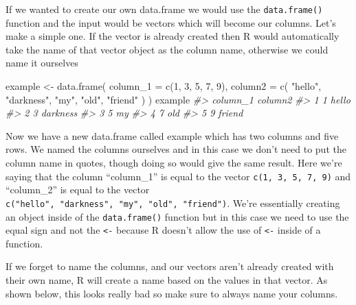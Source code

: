 \documentclass[
]{krantz}
\makeatletter
\newenvironment{Shaded}{\begin{snugshade}}{\end{snugshade}}
\newcommand{\AttributeTok}[1]{\textcolor[rgb]{0.61,0.61,0.61}{#1}}
\newcommand{\CommentTok}[1]{\textcolor[rgb]{0.37,0.37,0.37}{\textit{#1}}}
\newcommand{\DecValTok}[1]{\textcolor[rgb]{0.06,0.06,0.06}{#1}}
\newcommand{\FunctionTok}[1]{\textcolor[rgb]{0,0,0}{#1}}
\newcommand{\NormalTok}[1]{#1}
\newcommand{\OtherTok}[1]{\textcolor[rgb]{0.37,0.37,0.37}{#1}}
\newcommand{\StringTok}[1]{\textcolor[rgb]{0.5,0.5,0.5}{#1}}
\newenvironment{kframe}{%
\medskip{}
\setlength{\fboxsep}{.8em}
 \def\at@end@of@kframe{}%
 \ifinner\ifhmode%
  \def\at@end@of@kframe{\end{minipage}}%
  \begin{minipage}{\columnwidth}%
 \fi\fi%
 \def\FrameCommand##1{\hskip\@totalleftmargin \hskip-\fboxsep
 \colorbox{shadecolor}{##1}\hskip-\fboxsep
     \hskip-\linewidth \hskip-\@totalleftmargin \hskip\columnwidth}%
 \MakeFramed {\advance\hsize-\width
   \@totalleftmargin\z@ \linewidth\hsize
   \@setminipage}}%
 {\par\unskip\endMakeFramed%
 \at@end@of@kframe}
\renewenvironment{Shaded}{\begin{kframe}}{\end{kframe}}
\makeatother
\begin{document}
If we wanted to create our own data.frame we would use the
\texttt{data.frame()} function and the input would be
vectors which will become our columns. Let's make a simple
one. If the vector is already created then R would
automatically take the name of that vector object as the
column name, otherwise we could name it ourselves

\begin{Shaded}
\begin{Highlighting}[]
\NormalTok{example }\OtherTok{\textless{}{-}} \FunctionTok{data.frame}\NormalTok{(}
  \AttributeTok{column\_1 =} \FunctionTok{c}\NormalTok{(}\DecValTok{1}\NormalTok{, }\DecValTok{3}\NormalTok{, }\DecValTok{5}\NormalTok{, }\DecValTok{7}\NormalTok{, }\DecValTok{9}\NormalTok{),}
  \AttributeTok{column2 =} \FunctionTok{c}\NormalTok{(}
    \StringTok{"hello"}\NormalTok{,}
    \StringTok{"darkness"}\NormalTok{,}
    \StringTok{"my"}\NormalTok{,}
    \StringTok{"old"}\NormalTok{,}
    \StringTok{"friend"}
\NormalTok{  )}
\NormalTok{)}
\NormalTok{example}
\CommentTok{\#\textgreater{}   column\_1  column2}
\CommentTok{\#\textgreater{} 1        1    hello}
\CommentTok{\#\textgreater{} 2        3 darkness}
\CommentTok{\#\textgreater{} 3        5       my}
\CommentTok{\#\textgreater{} 4        7      old}
\CommentTok{\#\textgreater{} 5        9   friend}
\end{Highlighting}
\end{Shaded}

Now we have a new data.frame called example which has two
columns and five rows. We named the columns ourselves and in
this case we don't need to put the column name in quotes,
though doing so would give the same result. Here we're
saying that the column ``column\_1'' is equal to the vector
\texttt{c(1,\ 3,\ 5,\ 7,\ 9)} and ``column\_2'' is equal to
the vector
\texttt{c("hello",\ "darkness",\ "my",\ "old",\ "friend")}.
We're essentially creating an object inside of the
\texttt{data.frame()} function but in this case we need to
use the equal sign and not the \texttt{\textless{}-} because
R doesn't allow the use of \texttt{\textless{}-} inside of a
function.

If we forget to name the columns, and our vectors aren't
already created with their own name, R will create a name
based on the values in that vector. As shown below, this
looks really bad so make sure to always name your columns.
\end{document}
